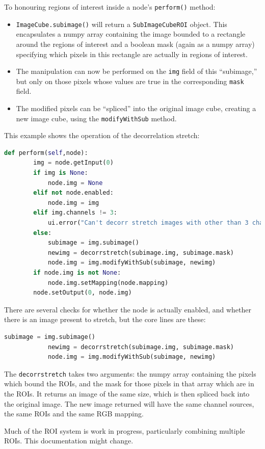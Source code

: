 To honouring regions of interest inside a node's \texttt{perform()} method:
\begin{itemize}
\item \texttt{ImageCube.subimage()} will return a \texttt{SubImageCubeROI} object. This encapsulates
a numpy array containing the image bounded to a rectangle around the regions of interest and
a boolean mask (again as a numpy array) specifying which pixels in this rectangle are actually
in regions of interest.
\item The manipulation can now be performed on the \texttt{img} field of this ``subimage,'' but
only on those pixels whose values are true in the corresponding \texttt{mask} field.
\item The modified pixels can be ``spliced'' into the original image cube, creating a new image
cube, using the \texttt{modifyWithSub} method.
\end{itemize}
This example shows the operation of the decorrelation stretch:
\begin{lstlisting}[language=Python]
    def perform(self,node):
        img = node.getInput(0)
        if img is None:
            node.img = None
        elif not node.enabled:
            node.img = img
        elif img.channels != 3:
            ui.error("Can't decorr stretch images with other than 3 channels")
        else:
            subimage = img.subimage()
            newimg = decorrstretch(subimage.img, subimage.mask)
            node.img = img.modifyWithSub(subimage, newimg)
        if node.img is not None:
            node.img.setMapping(node.mapping)
        node.setOutput(0, node.img)
\end{lstlisting}
There are several checks for whether the node is actually enabled, and whether there is an image
present to stretch, but the core lines are these:
\begin{lstlisting}[language=Python]
            subimage = img.subimage()
            newimg = decorrstretch(subimage.img, subimage.mask)
            node.img = img.modifyWithSub(subimage, newimg)
\end{lstlisting}
The \texttt{decorrstretch} takes two arguments: the numpy array containing the pixels which bound
the ROIs, and the mask for those pixels in that array which are in the ROIs. It returns an image
of the same size, which is then spliced back into the original image. The new image returned
will have the same channel sources, the same ROIs and the same RGB mapping.

\begin{notebox}
Much of the ROI system is work in progress, particularly combining
multiple ROIs. This documentation might change.
\end{notebox}
